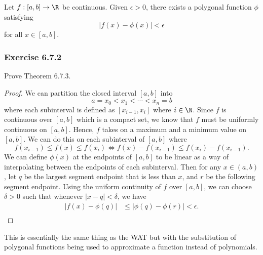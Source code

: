 \begin{theorem}{}{}
    Let \( f: [a,b] \to \R  \) be continuous. Given \( \epsilon > 0   \), there exists a polygonal function \( \phi  \) satisfying 
    \[  | f(x) - \phi(x) | < \epsilon \] for all \( x \in [a,b] \).
\end{theorem}

\subsubsection{Exercise 6.7.2} Prove Theorem 6.7.3.
\begin{proof}
    We can partition the closed interval \( [a,b]  \) into 
    \[  a = x_{0} < x_{1} < \dotsb < x_{n} = b  \] where each subinterval is defined as \( [x_{i-1}, x_{i}] \) where \( i \in \N  \). Since \( f  \) is continuous over \( [a,b]  \) which is a compact set, we know that \( f  \) must be uniformly continuous on \( [a,b] \). Hence, \( f  \) takes on a maximum and a minimum value on \( [a,b] \). We can do this on each subinterval of \( [a,b]  \) where 
    \[  f(x_{i-1}) \leq f(x) \leq f(x_{i}) \iff f(x) - f(x_{i-1}) \leq f(x_{i}) - f(x_{i-1}) .\] We can define \( \phi(x)  \) at the endpoints of \( [a,b]  \) to be linear as a way of interpolating between the endpoints of each subinterval. Then for any \( x \in (a,b)  \), let \( q  \) be the largest segment endpoint that is less  than \( x  \), and \( r  \) be the following segment endpoint. Using the uniform continuity of \( f \) over \( [a,b]  \), we can choose \( \delta > 0  \) such that whenever 
    \( | x - q  | <  \delta \), we have 
    \begin{align*}
        | f(x) - \phi(q)  | &\leq |  \phi(q) - \phi(r) | < \epsilon. \\
    \end{align*}
\end{proof}

This is essentially the same thing as the WAT but with the substitution of polygonal functions being used to approximate a function instead of polynomials.

